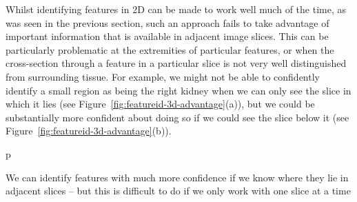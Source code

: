 Whilst identifying features in 2D can be made to work well much of the time, as was seen in the previous section, such an approach fails to take advantage of important information that is available in adjacent image slices. This can be particularly problematic at the extremities of particular features, or when the cross-section through a feature in a particular slice is not very well distinguished from surrounding tissue. For example, we might not be able to confidently identify a small region as being the right kidney when we can only see the slice in which it lies (see Figure~\ref{fig:featureid-3d-advantage}(a)), but we could be substantially more confident about doing so if we could see the slice below it (see Figure~\ref{fig:featureid-3d-advantage}(b)).

\begin{stusubfig}{p}
	\hspace{4mm}%
\caption{We can identify features with much more confidence if we know where they lie in adjacent slices -- but this is difficult to do if we only work with one slice at a time}
\label{fig:featureid-3d-advantage}
\end{stusubfig}

